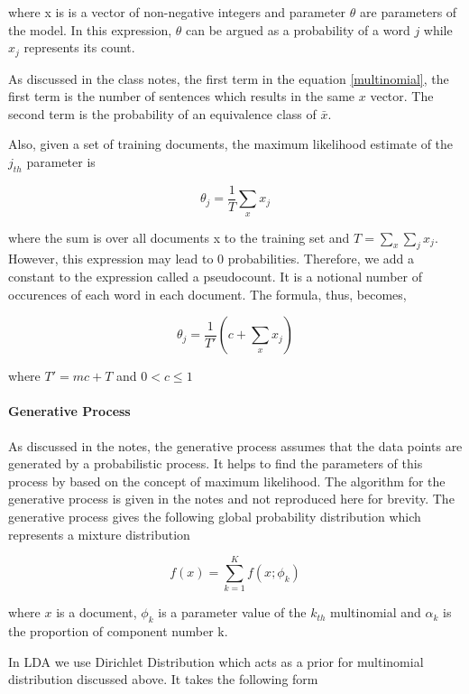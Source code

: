 \documentclass[11pt,a4paper,oneside]{article}
\begin{document}
where x is is a vector of non-negative integers and parameter $\theta$ are parameters of the model. In this expression, $\theta$ can be argued as a probability of a word $j$ while $x_j$ represents its count.

As discussed in the class notes, the first term in the equation \ref{multinomial}, the first term is the number of sentences which results in the same $x$ vector. The second term is the probability of an equivalence class of $\bar{x}$.

Also, given a set of training documents, the maximum likelihood estimate of the $j_{th}$ parameter is

\begin{equation}
\theta_j = \frac{1}{T} \sum_x x_j
\end{equation}

where the sum is over all documents x to the training set and $T = \sum_x{\sum_j{x_j}} $. However, this expression may lead to $0$ probabilities. Therefore, we add a constant to the expression called a pseudocount. It is a notional number of occurences of each word in each document. The formula, thus, becomes,

\begin{equation}
\theta_j = \frac{1}{T'} (c + \sum_x x_j)
\end{equation}

where $T' = mc + T$ and $0 < c \leq 1 $
\paragraph{Generative Process}
As discussed in the notes, the generative process assumes that the data points are generated by a probabilistic process. It helps to find the parameters of this process by based on the concept of maximum likelihood. The algorithm for the generative process is given in the notes\cite{classNotes} and not reproduced here for brevity. The generative process gives the following global probability distribution which represents a mixture distribution

\begin{equation}
f(x) = \sum^K_{k=1}f(x;\phi_k)
\end{equation}

where $x$ is a document, $\phi_k$ is a parameter value of the $k_{th}$ multinomial and $\alpha_k$ is the proportion of component number k.

In LDA we use Dirichlet Distribution which acts as a prior for multinomial distribution discussed above. It takes the following form \cite{classNotes}
\end{document}
